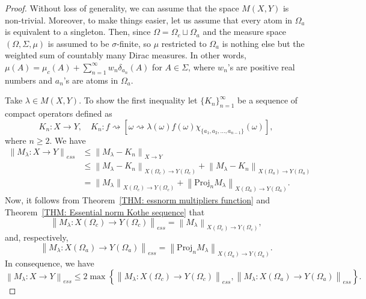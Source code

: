 \documentclass[10pt,a4paper]{amsart}
\newcommand{\norm}[1]{\left\lVert#1\right\rVert}
\begin{document}
\begin{proof}
	Without loss of generality, we can assume that the space $M(X,Y)$ is non-trivial.
	Moreover, to make things easier, let us assume that every atom in $\Omega_a$ is equivalent to a singleton.
	Then, since $\Omega = \Omega_c \sqcup \Omega_a$ and the measure space $(\Omega,\Sigma,\mu)$ is assumed to be $\sigma$-finite,
	so $\mu$ restricted to $\Omega_a$ is nothing else but the weighted sum of countably many Dirac measures.
	In other words, $\mu(A) = \mu_c(A) + \sum_{n=1}^{\infty} w_n \delta_{a_n}(A)$ for $A \in \Sigma$,
	where $w_n$'s are positive real numbers and $a_n$'s are atoms in $\Omega_a$.
	
	Take $\lambda \in M(X,Y)$.
	To show the first inequality let $\{K_n\}_{n=1}^{\infty}$ be a sequence of compact operators defined as
	\begin{equation*}
		K_n \colon X \rightarrow Y, \quad
		K_n \colon f \rightsquigarrow \left[ \omega \rightsquigarrow \lambda(\omega) f(\omega) \chi_{\{ a_1,a_2,..., a_{n-1} \}}(\omega) \right],
	\end{equation*}
	where $n \geqslant 2$. We have
	\begin{align*}
		\norm{M_{\lambda} \colon X \rightarrow Y}_{ess} & \leqslant \norm{M_{\lambda} - K_n}_{X \rightarrow Y} \\
			& \leqslant \norm{M_{\lambda} - K_n}_{X(\Omega_c) \rightarrow Y(\Omega_c)} + \norm{M_{\lambda} - K_n}_{X(\Omega_a) \rightarrow Y(\Omega_a)} \\
			& = \norm{M_{\lambda}}_{X(\Omega_c) \rightarrow Y(\Omega_c)} + \norm{\text{Proj}_n M_{\lambda}}_{X(\Omega_a) \rightarrow Y(\Omega_a)}.
	\end{align*}
	Now, it follows from Theorem~\ref{THM: essnorm multipliers function} and Theorem~\ref{THM: Essential norm Kothe sequence} that
	\begin{equation*}
		\norm{M_{\lambda} \colon X(\Omega_c) \rightarrow Y(\Omega_c)}_{ess} = \norm{M_{\lambda}}_{X(\Omega_c) \rightarrow Y(\Omega_c)},
	\end{equation*}
	and, respectively,
	\begin{equation*}
		\norm{M_{\lambda} \colon X(\Omega_a) \rightarrow Y(\Omega_a)}_{ess}
			= \norm{\text{Proj}_n M_{\lambda}}_{X(\Omega_a) \rightarrow Y(\Omega_a)}.
	\end{equation*}
	In consequence, we have
	\begin{equation*}
		\norm{M_{\lambda} \colon X \rightarrow Y}_{ess}
			\leqslant 2\max \left\{ \norm{M_{\lambda} \colon X(\Omega_c) \rightarrow Y(\Omega_c)}_{ess}, \norm{M_{\lambda} \colon X(\Omega_a) \rightarrow Y(\Omega_a)}_{ess} \right\}.
	\end{equation*}


\end{proof}
\end{document}
